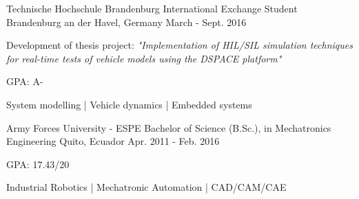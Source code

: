
\begin{cventries}

  \cventry
    {Technische Hochschule Brandenburg}
    {International Exchange Student}
    {Brandenburg an der Havel, Germany}
    {March - Sept. 2016}
    {
      \begin{cvitems}
        \item {Development of thesis project: \textit{"Implementation of HIL/SIL simulation techniques for real-time tests of vehicle models using the DSPACE platform"}}
        \item {GPA: A-}
        \item {System modelling | Vehicle dynamics | Embedded systems}
      \end{cvitems}
    }

  \cventry
    {Army Forces University - ESPE}
    {Bachelor of Science (B.Sc.), in Mechatronics Engineering}
    {Quito, Ecuador}
    {Apr. 2011 - Feb. 2016}
    {
      \begin{cvitems}
        \item {GPA: 17.43/20}
        \item {Industrial Robotics | Mechatronic Automation | CAD/CAM/CAE}
      \end{cvitems}
    }
    
    
\end{cventries}
